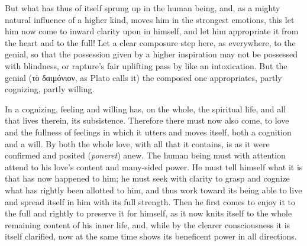 \documentclass[12pt,a4paper]{book}
\begin{document}
But what has thus of itself sprung up in the human being, and, as a mighty
natural influence of a higher kind, moves him in the strongest emotions,
this let him now come to inward clarity upon in himself, and let him
appropriate it from the heart and to the full! Let a clear composure step
here, as everywhere, to the genial, so that the possession given by a
higher inspiration may not be possessed with blindness, or rapture's fair
uplifting pass by like an intoxication. But the genial (τὸ δαιμόνιον, as
Plato calls it) the composed one appropriates, partly
cognizing, partly willing.

In a cognizing, feeling and willing has, on the whole, the spiritual life,
and all that lives therein, its subsistence. Therefore there must now also
come, to love and the fullness of feelings in which it utters and moves
itself, both a cognition and a will. By both the whole love, with all that
it contains, is as it were confirmed and posited (\textit{poneret}) anew.
The human being must with attention attend to his love's content and
many-sided power. He must tell himself what it is that has now happened to
him; he must seek with clarity to grasp and cognize what has rightly been
allotted to him, and thus work toward its being able to live and spread
itself in him with its full strength. Then he first comes to enjoy it to
the full and rightly to preserve it for himself, as it now knits itself to
the whole remaining content of his inner life, and, while by the clearer
consciousness it is itself clarified, now at the same time shows its
beneficent power in all directions.
\end{document}
